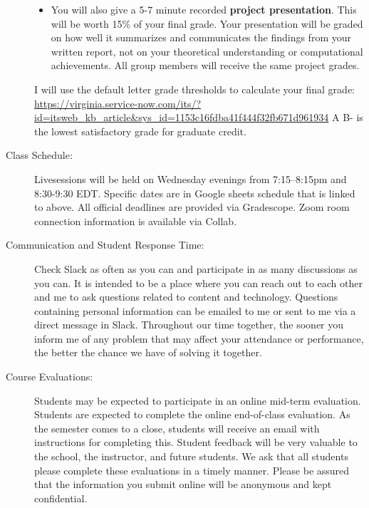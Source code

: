 \documentclass[11pt]{article}
\begin{document}
\begin{description}
\begin{itemize}
\item You will also give a 5-7 minute recorded {\bf project presentation}. This will be worth 15\% of your final grade. Your presentation
will be graded on how well it summarizes and communicates the findings from your written report, not on your theoretical understanding or computational achievements. All group members will receive the same project grades.
\end{itemize}  

I will use the default letter grade thresholds to calculate your final grade: \url{https://virginia.service-now.com/its/?id=itsweb_kb_article&sys_id=1153c16fdba41f444f32fb671d961934} A B- is the lowest satisfactory grade for graduate credit.

\item[Class Schedule:]  

Livesessions will be held on Wednesday evenings from 7:15–8:15pm and 8:30-9:30 EDT. Specific dates are in Google sheets schedule that is linked to above. All official deadlines are provided via Gradescope. Zoom room connection information is available via Collab.

\item[Communication and Student Response Time:]  

Check Slack as often as you can and participate in as many discussions as you can. It is intended to be a place where you can reach out to each other and me to ask questions related to content and technology. Questions containing personal information can be emailed to me or sent to me via a direct message in Slack. Throughout our time together, the sooner you inform me of any problem that may affect your attendance or performance, the better the chance we have of solving it together.


\item[Course Evaluations:]  

Students may be expected to participate in an online mid-term evaluation. Students are expected to complete the online end-of-class evaluation. As the semester comes to a close, students will receive an email with instructions for completing this. Student feedback will be very valuable to the school, the instructor, and future students. We ask that all students please complete these evaluations in a timely manner. Please be assured that the information you submit online will be anonymous and kept confidential.


\end{description}
\end{document}
